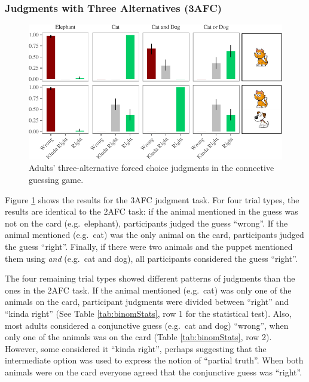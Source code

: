 \documentclass[oneside]{report}
\theoremstyle{definition}
\theoremstyle{definition}
\theoremstyle{definition}
\theoremstyle{remark}
\begin{document}
\subsubsection{Judgments with Three Alternatives
(3AFC)}\label{judgments-with-three-alternatives-3afc}
\begin{figure}[t]

{\centering \includegraphics{figs/ternaryAdultsPlot-1} 

}

\caption{Adults' three-alternative forced choice judgments in the connective guessing game.}\label{fig:ternaryAdultsPlot}
\end{figure}
Figure \ref{fig:ternaryAdultsPlot} shows the results for the 3AFC
judgment task. For four trial types, the results are identical to the
2AFC task: if the animal mentioned in the guess was not on the card
(e.g.~elephant), participants judged the guess ``wrong''. If the animal
mentioned (e.g.~cat) was the only animal on the card, participants
judged the guess ``right''. Finally, if there were two animals and the
puppet mentioned them using \emph{and} (e.g.~cat and dog), all
participants considered the guess ``right''.

The four remaining trial types showed different patterns of judgments
than the ones in the 2AFC task. If the animal mentioned (e.g.~cat) was
only one of the animals on the card, participant judgments were divided
between ``right'' and ``kinda right'' (See Table \ref{tab:binomStats},
row 1 for the statistical test). Also, most adults considered a
conjunctive guess (e.g.~cat and dog) ``wrong'', when only one of the
animals was on the card (Table \ref{tab:binomStats}, row 2). However,
some considered it ``kinda right'', perhaps suggesting that the
intermediate option was used to express the notion of ``partial truth''.
When both animals were on the card everyone agreed that the conjunctive
guess was ``right''.
\end{document}
